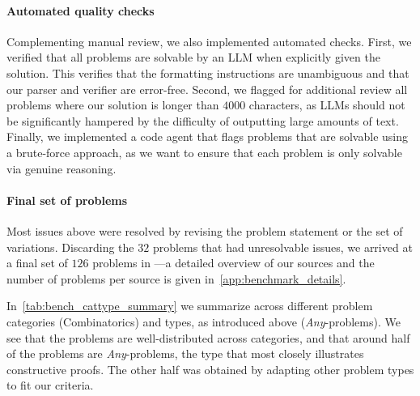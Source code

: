 \paragraph{Automated quality checks}
Complementing manual review, we also implemented automated checks.
First, we verified that all problems are solvable by an LLM when explicitly given the solution.
This verifies that the formatting instructions are unambiguous and that our parser and verifier are error-free. 
Second, we flagged for additional review all problems where our solution is longer than $4000$ characters, as LLMs should not be significantly hampered by the difficulty of outputting large amounts of text.
Finally, we implemented a code agent that flags problems that are solvable using a brute-force approach, as we want to ensure that each problem is only solvable via genuine reasoning.

\paragraph{Final set of problems}
Most issues above were resolved by revising the problem statement or the set of variations. Discarding the $32$ problems that had unresolvable issues, we arrived at a final set of $126$ problems in \mc{}---a detailed overview of our sources and the number of problems per source is given in~\cref{app:benchmark_details}.


In~\cref{tab:bench_cattype_summary} we summarize \mc{} across different problem categories (\eg Combinatorics) and types, as introduced above (\eg \emph{Any}-problems). 
We see that the problems are well-distributed across categories, and that around half of the problems are \emph{Any}-problems, the type that most closely illustrates constructive proofs.
The other half was obtained by adapting other problem types to fit our criteria.
